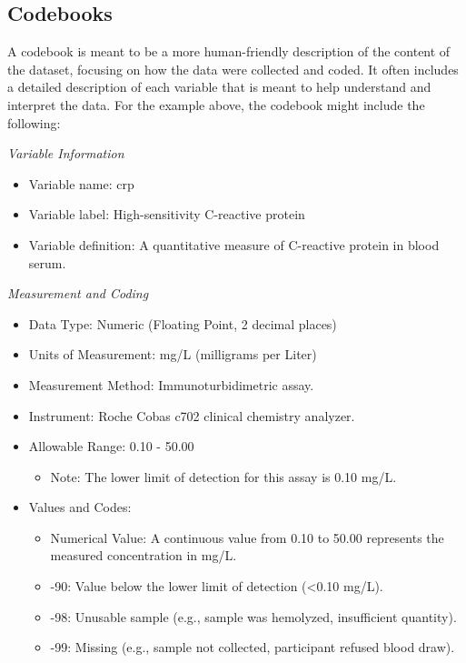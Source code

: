 \bigskip

\subsection{Codebooks}

A codebook is meant to be a more human-friendly description of the content of the dataset, focusing on how the data were collected and coded. It often includes a detailed description of each variable that is meant to help understand and interpret the data.  For the example above, the codebook might include the following:

\textit{Variable Information}

\begin{itemize}
\item Variable name: crp
\item Variable label: High-sensitivity C-reactive protein
\item Variable definition: A quantitative measure of C-reactive protein in blood serum.
\end{itemize}

\textit{Measurement and Coding}

\begin{itemize}
\item Data Type: Numeric (Floating Point, 2 decimal places)
\item Units of Measurement: mg/L (milligrams per Liter)
\item Measurement Method: Immunoturbidimetric assay.
\item Instrument: Roche Cobas c702 clinical chemistry analyzer.
\item Allowable Range: 0.10 - 50.00

\begin{itemize}
\item Note: The lower limit of detection for this assay is 0.10 mg/L.
\end{itemize}


\item Values and Codes:

\begin{itemize}
\item Numerical Value: A continuous value from 0.10 to 50.00 represents the measured concentration in mg/L.
\item-90: Value below the lower limit of detection (\textless  0.10 mg/L).
\item-98: Unusable sample (e.g., sample was hemolyzed, insufficient quantity).
\item-99: Missing (e.g., sample not collected, participant refused blood draw).
\end{itemize}
\end{itemize}

